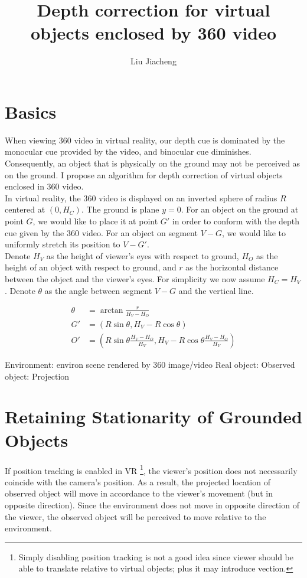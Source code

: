 \documentclass[12pt]{article}
\title{Depth correction for virtual objects enclosed by 360 video}
\author{Liu Jiacheng}
\begin{document}
\maketitle

\section{Basics}

When viewing 360 video in virtual reality, our depth cue is dominated by the monocular cue provided by the video, and binocular cue diminishes. Consequently, an object that is physically on the ground may not be perceived as on the ground. I propose an algorithm for depth correction of virtual objects enclosed in 360 video. \\

In virtual reality, the 360 video is displayed on an inverted sphere of radius $R$ centered at $(0, H_C)$. The ground is plane $y = 0$. For an object on the ground at point $G$, we would like to place it at point $G'$ in order to conform with the depth cue given by the 360 video. For an object on segment $V-G$, we would like to uniformly stretch its position to $V-G'$. \\

Denote $H_V$ as the height of viewer's eyes with respect to ground, $H_O$ as the height of an object with respect to ground, and $r$ as the horizontal distance between the object and the viewer's eyes. For simplicity we now assume $H_C = H_V$. Denote $\theta$ as the angle between segment $V-G$ and the vertical line. 

\begin{align*}
	\theta &= \arctan{\frac{r}{H_V - H_O}} \\
	G' &= (R\sin{\theta}, H_V - R\cos{\theta}) \\
	O' &= (R\sin{\theta} \frac{H_V - H_O}{H_V}, H_V - R\cos{\theta}\frac{H_V - H_O}{H_V})
\end{align*}

Environment: environ scene rendered by 360 image/video
Real object: 
Observed object: 
Projection

\section{Retaining Stationarity of Grounded Objects}

If position tracking is enabled in VR \footnote{Simply disabling position tracking is not a good idea since viewer should be able to translate relative to virtual objects; plus it may introduce vection. }, the viewer's position does not necessarily coincide with the camera's position. As a result, the projected location of observed object will move in accordance to the viewer's movement (but in opposite direction). Since the environment does not move in opposite direction of the viewer, the observed object will be perceived to move relative to the environment. \\
\end{document}
